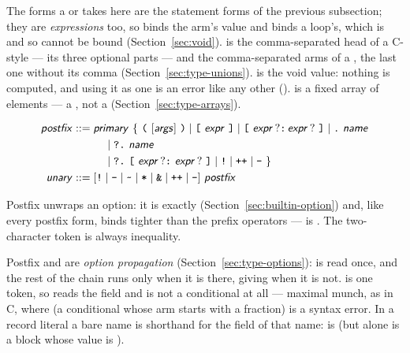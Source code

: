 \noindent The forms a  or  takes here are the
statement forms of the previous subsection; they are \emph{expressions}
too, so  binds the arm's value
and  binds a loop's, which is
 and so cannot be bound (Section~\ref{sec:void}).  is
the comma-separated head of a C-style  --- its three optional
parts --- and  the comma-separated  arms of
a , the last one without its comma
(Section~\ref{sec:type-unions}). \ic{()} is
the void value: nothing is computed, and using it as one is an error
like any other (). \ic{[e; n]} is a
fixed array of  elements --- a \ic{[T; N]}, not a \ic{[T]}
(Section~\ref{sec:type-arrays}).

\begin{align*}
\ty{postfix} ::={}& \ty{primary}
   ~\{~\ic{(}~[\ty{args}]~\ic{)} \mid \ic{[}~\ty{expr}~\ic{]}
   \mid \ic{[}~\ty{expr}\,?\ic{:}\,\ty{expr}\,?~\ic{]} \mid \ic{.}~\ty{name} \\
 &\quad \mid \ic{?.}~\ty{name} \\
 &\quad \mid \ic{?.}~\ic{[}~\ty{expr}\,?\ic{:}~\ty{expr}\,?~\ic{]}
   \mid \ic{!} \mid \ic{++} \mid \ic{--}~\} \\
\ty{unary} ::={}& [\ic{!} \mid \ic{-} \mid \ic{\textasciitilde{}} \mid \ic{*} \mid \ic{\&}
   \mid \ic{++} \mid \ic{--}]~\ty{postfix}
\end{align*}

\noindent Postfix  unwraps an option: it is exactly
 (Section~\ref{sec:builtin-option}) and, like every
postfix form, binds tighter than the prefix operators ---  is
. The two-character token \ic{!=} is always inequality.

\noindent Postfix  and  are \emph{option
propagation} (Section~\ref{sec:type-options}):  is read once, and
the rest of the chain runs only when it is there, giving  when
it is not.  is one token, so  reads the field  and
 is not a conditional at all --- maximal munch, as in C,
where  (a conditional whose arm starts with a fraction) is
a syntax error.
In a record literal a bare name is shorthand for the field of that
name:  is  (but  alone is a
block whose value is ).

